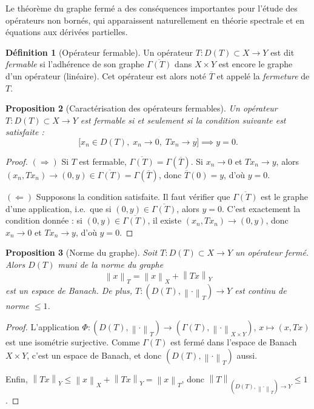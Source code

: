\documentclass[a4paper,12pt]{book}
\newcommand{\norm}[1]{\left\| #1 \right\|}
\theoremstyle{definition}
\newtheorem{definition}{Définition}[chapter]
\theoremstyle{plain}
\newtheorem{proposition}[definition]{Proposition}
\theoremstyle{remark}
\begin{document}
Le théorème du graphe fermé a des conséquences importantes pour l'étude des
opérateurs non bornés, qui apparaissent naturellement en théorie spectrale
et en équations aux dérivées partielles.

\begin{definition}[Opérateur fermable]
\label{def:fermable}
Un opérateur $T : D(T) \subset X \to Y$ est dit \emph{fermable} si
l'adhérence de son graphe $\overline{\Gamma(T)}$ dans $X \times Y$ est
encore le graphe d'un opérateur (linéaire). Cet opérateur est alors noté
$\overline{T}$ et appelé la \emph{fermeture} de $T$.
\end{definition}

\begin{proposition}[Caractérisation des opérateurs fermables]
\label{prop:caract-fermable}
Un opérateur $T : D(T) \subset X \to Y$ est fermable si et seulement si
la condition suivante est satisfaite :
\[
  \bigl[ x_n \in D(T),\; x_n \to 0,\; Tx_n \to y \bigr]
  \implies y = 0.
\]
\end{proposition}

\begin{proof}
$(\Rightarrow)$ Si $T$ est fermable, $\overline{\Gamma(T)} = \Gamma(\overline{T})$.
Si $x_n \to 0$ et $Tx_n \to y$, alors $(x_n, Tx_n) \to (0,y) \in \overline{\Gamma(T)} = \Gamma(\overline{T})$,
donc $\overline{T}(0) = y$, d'où $y = 0$.

$(\Leftarrow)$ Supposons la condition satisfaite. Il faut vérifier que
$\overline{\Gamma(T)}$ est le graphe d'une application, i.e.\ que si $(0,y) \in \overline{\Gamma(T)}$,
alors $y = 0$. C'est exactement la condition donnée : si $(0,y) \in \overline{\Gamma(T)}$,
il existe $(x_n, Tx_n) \to (0,y)$, donc $x_n \to 0$ et $Tx_n \to y$, d'où $y = 0$.
\end{proof}

\begin{proposition}[Norme du graphe]
\label{prop:norme-graphe}
Soit $T : D(T) \subset X \to Y$ un opérateur fermé. Alors $D(T)$ muni de
la \emph{norme du graphe}
\[
  \norm{x}_T = \norm{x}_X + \norm{Tx}_Y
\]
est un espace de Banach. De plus, $T : (D(T), \norm{\cdot}_T) \to Y$ est
continu de norme $\leq 1$.
\end{proposition}

\begin{proof}
L'application $\Phi : (D(T), \norm{\cdot}_T) \to (\Gamma(T), \norm{\cdot}_{X \times Y})$,
$x \mapsto (x, Tx)$ est une isométrie surjective. Comme $\Gamma(T)$
est fermé dans l'espace de Banach $X \times Y$, c'est un espace de Banach,
et donc $(D(T), \norm{\cdot}_T)$ aussi.

Enfin, $\norm{Tx}_Y \leq \norm{x}_X + \norm{Tx}_Y = \norm{x}_T$, donc
$\norm{T}_{(D(T),\norm{\cdot}_T) \to Y} \leq 1$.
\end{proof}
\end{document}

